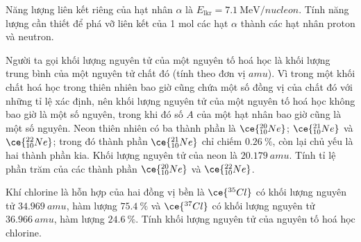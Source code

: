 \begin{ex}
	Năng lượng liên kết riêng của hạt nhân $\alpha$ là $E_{\mathrm{lkr}}=\SI{7.1}{\mega\electronvolt/nucleon}$. Tính năng lượng cần thiết  để phá vỡ liên kết của 1 mol các hạt $\alpha$ thành các hạt nhân proton và neutron.
\end{ex}
\begin{ex}
	Người ta gọi khối lượng nguyên tử của một nguyên tố hoá học là khối lượng trung bình của một nguyên tử chất đó (tính theo đơn vị $\si{amu}$). Vì trong một khối chất hoá học trong thiên nhiên bao giờ cũng chứa một số đồng vị của chất đó với những tỉ lệ xác định, nên khối lượng nguyên tử của một nguyên tố hoá học không bao giờ là một số nguyên, trong khi đó số $A$ của một hạt nhân bao giờ cũng là một số nguyên. Neon thiên nhiên có ba thành phần là $\ce{_{10}^{20}Ne}$; $\ce{_{10}^{21}Ne}$ và $\ce{_{10}^{22}Ne}$; trong đó thành phần $\ce{_{10}^{21}Ne}$ chỉ chiếm $\SI{0.26}{\percent}$, còn lại chủ yếu là hai thành phần kia. Khối lượng nguyên tử của neon là $\SI{20.179}{amu}$. Tính tỉ lệ phần trăm của các thành phần $\ce{_{10}^{20}Ne}$ và $\ce{_{10}^{22}Ne}$.
\end{ex}
\begin{ex}
	Khí chlorine là hỗn hợp của hai đồng vị bền là $\ce{^{35}Cl}$ có khối lượng nguyên tử $\SI{34.969}{amu}$, hàm lượng $\SI{75.4}{\percent}$ và $\ce{^{37}Cl}$ có khối lượng nguyên tử $\SI{36.966}{amu}$, hàm lượng $\SI{24.6}{\percent}$. Tính khối lượng nguyên tử của nguyên tố hoá học chlorine.
\end{ex}
